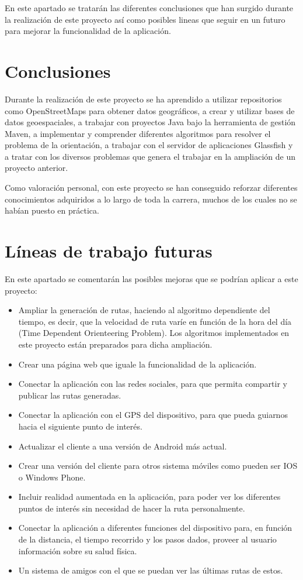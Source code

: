 En este apartado se tratarán las diferentes conclusiones que han surgido durante la realización de este proyecto así como posibles lineas que seguir en un futuro para mejorar la funcionalidad de la aplicación.

\section{Conclusiones}
Durante la realización de este proyecto se ha aprendido a utilizar repositorios como OpenStreetMaps para obtener datos geográficos, a crear y utilizar bases de datos geoespaciales, a trabajar con proyectos Java bajo la herramienta de gestión Maven, a implementar y comprender diferentes algoritmos para resolver el problema de la orientación, a trabajar con el servidor de aplicaciones Glassfish y a tratar con los diversos problemas que genera el trabajar en la ampliación de un proyecto anterior.

Como valoración personal, con este proyecto se han conseguido reforzar diferentes conocimientos adquiridos a lo largo de toda la carrera, muchos de los cuales no se habían puesto en práctica.

\section{Líneas de trabajo futuras}
En este apartado se comentarán las posibles mejoras que se podrían aplicar a este proyecto:
\begin{itemize}
\item Ampliar la generación de rutas, haciendo al algoritmo dependiente del tiempo, es decir, que la velocidad de ruta varíe en función de la hora del día (Time Dependent Orienteering Problem). Los algoritmos implementados en este proyecto están preparados para dicha ampliación.
\item Crear una página web que iguale la funcionalidad de la aplicación.
\item Conectar la aplicación con las redes sociales, para que permita compartir y publicar las rutas generadas.
\item Conectar la aplicación con el GPS del dispositivo, para que pueda guiarnos hacia el siguiente punto de interés.
\item Actualizar el cliente a una versión de Android más actual.
\item Crear una versión del cliente para otros sistema móviles como pueden ser IOS o Windows Phone.
\item Incluir realidad aumentada en la aplicación, para poder ver los diferentes puntos de interés sin necesidad de hacer la ruta personalmente.
\item Conectar la aplicación a diferentes funciones del dispositivo para, en función de la distancia, el tiempo recorrido y los pasos dados, proveer al usuario información sobre su salud física.
\item Un sistema de amigos con el que se puedan ver las últimas rutas de estos.
\end{itemize}